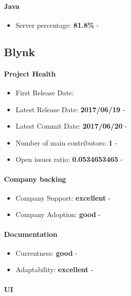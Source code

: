 \documentclass{article}
\begin{document}
\paragraph{Java} 

\begin{itemize}
\item Server percentage: \textbf{81.8\%} - 
\end{itemize}

\subsection{Blynk}

\paragraph{Project Health}

\begin{itemize}
\item First Release Date: 
\item Latest Release Date: \textbf{2017/06/19} - 
\item Latest Commit Date: \textbf{2017/06/20} - 
\item Number of main contributors: \textbf{1} - 
\item Open issues ratio: \textbf{0.0534653465} - 
\end{itemize}

\paragraph{Company backing}

\begin{itemize}
\item Company Support: \textbf{excellent} - 
\item Company Adoption: \textbf{good} - 
\end{itemize}

\paragraph{Documentation}

\begin{itemize}
\item Currentness: \textbf{good} - 
\item Adaptability: \textbf{excellent} - 
\end{itemize}

\paragraph{UI}
\end{document}
